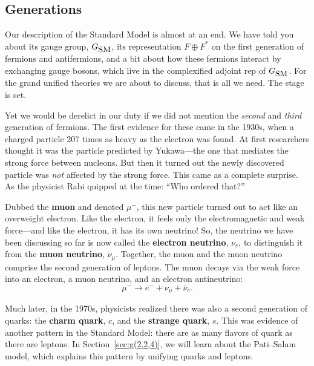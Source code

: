 \documentclass[12pt]{article}
\newcommand{\GSM}{{G_{\mbox{\rm SM}}}}  %
\newcommand{\nubar}{\overline{\nu}} %
\begin{document}
\subsection{Generations} \label{sec:generations}

Our description of the Standard Model is almost at an end. We have told you
about its gauge group, $\GSM$, its representation $F \oplus F^*$ on the
first generation of fermions and antifermions, and a bit about how
these fermions interact by exchanging gauge bosons, which live in the
complexified adjoint rep of $\GSM$.  For the grand unified theories we
are about to discuss, that is all we need.  The stage is set.

Yet we would be derelict in our duty if we did not mention the
\emph{second} and \emph{third} generation of fermions.  The first
evidence for these came in the 1930s, when a charged particle 207
times as heavy as the electron was found.  At first researchers
thought it was the particle predicted by Yukawa---the one that
mediates the strong force between nucleons.  But then it 
turned out the newly discovered particle was \emph{not} affected by
the strong force.  This came as a complete surprise.  
As the physicist Rabi quipped at the time: ``Who ordered that?''

Dubbed the \textbf{muon} and denoted $\mu^-$, this new particle turned
out to act like an overweight electron.  Like the electron, it
feels only the electromagnetic and weak force---and
like the electron, it has its own neutrino!  So, the neutrino we have
been discussing so far is now called the \textbf{electron neutrino}, $\nu_e$,
to distinguish it from the \textbf{muon neutrino}, $\nu_\mu$.  Together, the
muon and the muon neutrino comprise the second generation of leptons.
The muon decays via the weak force
into an electron, a muon neutrino, and an electron antineutrino:
\[ \mu^- \to e^- + \nu_{\mu} + \nubar_e .\]

Much later, in the 1970s, physicists realized there was also a second
generation of quarks: the \textbf{charm quark}, $c$, and the
\textbf{strange quark}, $s$. This was evidence of another pattern in the
Standard Model: there are as many flavors of quark as there are
leptons. In Section~\ref{sec:g(2,2,4)}, we will learn about the
Pati--Salam model, which explains this pattern by unifying quarks and
leptons.
\end{document}
